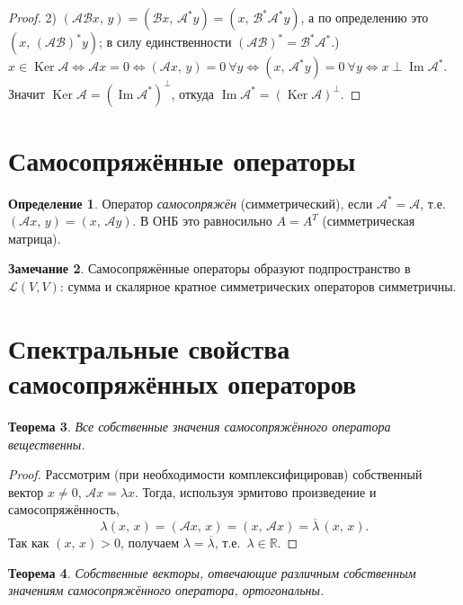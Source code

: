 \documentclass[11pt,a4paper]{article}
\theoremstyle{definition}
\newtheorem{definition}{Определение}[section]
\newtheorem{remark}[definition]{Замечание}
\theoremstyle{plain}
\newtheorem{theorem}[definition]{Теорема}
\DeclareMathOperator{\Ker}{Ker}
\DeclareMathOperator{\Img}{Im}
\newcommand{\R}{\mathbb{R}}
\newcommand{\scal}[2]{\left( #1,\,#2\right)}
\begin{document}
\begin{proof}
2) $\scal{\mathcal A\mathcal Bx}{y}=\scal{\mathcal Bx}{\mathcal A^*y}=\scal{x}{\mathcal B^*\mathcal A^*y}$,
а по определению это $\scal x{(\mathcal A\mathcal B)^*y}$; в силу единственности
$(\mathcal A\mathcal B)^*=\mathcal B^*\mathcal A^*$.) $x\in\Ker\mathcal A\iff\mathcal Ax=0\iff\scal{\mathcal Ax}{y}=0\ \forall y
\iff\scal{x}{\mathcal A^*y}=0\ \forall y\iff x\perp\Img\mathcal A^*$. Значит
$\Ker\mathcal A=(\Img\mathcal A^*)^\perp$, откуда $\Img\mathcal A^*=(\Ker\mathcal A)^\perp$.
\end{proof}

\section{Самосопряжённые операторы}

\begin{definition}
Оператор \emph{самосопряжён} (симметрический), если $\mathcal A^*=\mathcal A$, т.е.\
$\scal{\mathcal Ax}{y}=\scal{x}{\mathcal Ay}$. В ОНБ это равносильно $A=A^{T}$ (симметрическая
матрица).
\end{definition}

\begin{remark}
Самосопряжённые операторы образуют подпространство в $\mathcal L(V,V)$: сумма и скалярное кратное
симметрических операторов симметричны.
\end{remark}

\section{Спектральные свойства самосопряжённых операторов}

\begin{theorem}
Все собственные значения самосопряжённого оператора вещественны.
\end{theorem}

\begin{proof}
Рассмотрим (при необходимости комплексифицировав) собственный вектор $x\ne0$, $\mathcal Ax=\lambda x$.
Тогда, используя эрмитово произведение и самосопряжённость,
\[
  \lambda\scal xx=\scal{\mathcal Ax}{x}=\scal{x}{\mathcal Ax}=\overline\lambda\,\scal xx .
\]
Так как $\scal xx>0$, получаем $\lambda=\overline\lambda$, т.е.\ $\lambda\in\R$.
\end{proof}

\begin{theorem}
Собственные векторы, отвечающие различным собственным значениям самосопряжённого оператора,
ортогональны.
\end{theorem}
\end{document}
